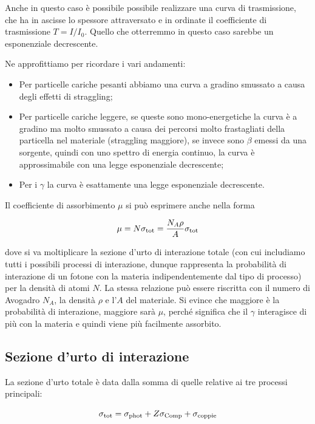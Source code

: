Anche in questo caso è possibile possibile realizzare una curva di trasmissione, che ha in ascisse lo spessore attraversato e in ordinate il coefficiente di trasmissione $T=I/I_0$. Quello che otterremmo in questo caso sarebbe un esponenziale decrescente.

Ne approfittiamo per ricordare i vari andamenti:

\begin{itemize}
    \item Per particelle cariche pesanti abbiamo una curva a gradino smussato a causa degli effetti di straggling;
    \item Per particelle cariche leggere, se queste sono mono-energetiche la curva è a gradino ma molto smussato a causa dei percorsi molto frastagliati della particella nel materiale (straggling maggiore), se invece sono $\beta$ emessi da una sorgente, quindi con uno spettro di energia continuo, la curva è approssimabile con una legge esponenziale decrescente;
    \item Per i $\gamma$ la curva è esattamente una legge esponenziale decrescente.
\end{itemize}

Il coefficiente di assorbimento $\mu$ si può esprimere anche nella forma

\begin{equation*}
    \mu=N \sigma_{\rm tot}
    =\frac{N_A \rho}{A} \sigma_{\rm tot}
\end{equation*}

dove si va moltiplicare la sezione d'urto di interazione totale (con cui includiamo tutti i possibili processi di interazione, dunque rappresenta la probabilità di interazione di un fotone con la materia indipendentemente dal tipo di processo) per la densità di atomi $N$. La stessa relazione può essere riscritta con il numero di Avogadro $N_A$, la densità $\rho$ e l'$A$ del materiale. Si evince che maggiore è la probabilità di interazione, maggiore sarà $\mu$, perché significa che il $\gamma$ interagisce di più con la materia e quindi viene più facilmente assorbito.

\subsection{Sezione d'urto di interazione}

La sezione d'urto totale è data dalla somma di quelle relative ai tre processi principali:

\begin{equation*}
    \sigma_{\rm tot}
    =\sigma_{\rm phot} + Z \sigma_{\rm Comp} + \sigma_{\rm coppie}
\end{equation*}


